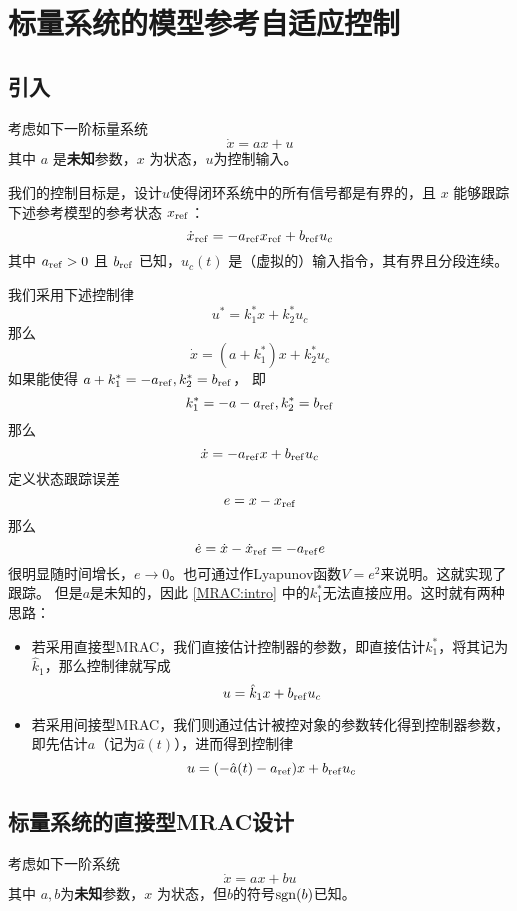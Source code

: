 \newpage
\section{标量系统的模型参考自适应控制}\label{4Bref}
\subsection{引入}
考虑如下一阶标量系统
\[ \dot{x} = a  x + u \]
其中 $a$ 是{\bf 未知}参数，$x$ 为状态，$u$为控制输入。

我们的控制目标是，设计$u$使得闭环系统中的所有信号都是有界的，且 $x$ 能够跟踪下述参考模型的参考状态  $x_{\operatorname{ref}}$：
\[ \dot{x}_{\operatorname{ref}} = - a_{\operatorname{ref}} x_{\operatorname{ref}} + b_{\operatorname{ref}} u_c \]
其中 $a_{\operatorname{ref}} > 0$ 且 $b_{\operatorname{ref}}$ 已知，$u_c (t)$ 是（虚拟的）输入指令，其有界且分段连续。

我们采用下述控制律
\[ u^{\ast} = k^{\ast}_1 x + k^{\ast}_2 u_c \]
那么
\[\dot{x} = (a +  k^{\ast}_1) x + k^{\ast}_2 {u_c} \]
如果能使得
$a+k^{\ast}_1=-a_{\operatorname{ref}},k^{\ast}_2=b_{\operatorname{ref}}$，
即
\begin{equation}\label{MRAC:intro}
  k^{\ast}_1 = - a - a_{\operatorname{ref}}, k^{\ast}_2 =  b_{\operatorname{ref}}
\end{equation}
那么
\[\dot{x} = -a_{\operatorname{ref}} x + b_{\operatorname{ref}} {u_c} \]
定义状态跟踪误差
\[ e = x - x_{\operatorname{ref}} \]
那么
\[ \dot{e} = \dot{x} - \dot{x}_{\operatorname{ref}} = - a_{\operatorname{ref}} e \]
很明显随时间增长，$e\to 0$。也可通过作Lyapunov函数$V=e^2$来说明。这就实现了跟踪。
但是$a$是未知的，因此 \eqref{MRAC:intro} 中的$k_1^\ast$无法直接应用。这时就有两种思路：
\begin{itemize}
  \item 若采用直接型MRAC，我们直接估计控制器的参数，即直接估计$k_1^\ast$，将其记为$\hat{k}_1$，那么控制律就写成
        \[u=\hat{k}_1 x + b_{\operatorname{ref}} u_c\]
  \item 若采用间接型MRAC，我们则通过估计被控对象的参数转化得到控制器参数，即先估计$a$（记为$ \hat{a} (t)$），进而得到控制律
        \[u=(- \hat{a} (t) - a_{\operatorname{ref}}) x + b_{\operatorname{ref}} u_c\]
\end{itemize}
\newpage
\subsection{标量系统的直接型MRAC设计}\label{sec:MRAC:scalar:direct}
考虑如下一阶系统
\begin{equation}
  \dot{x} = a  x + b  u \label{Sys:MRAC:scalar}
\end{equation}
其中 $a, b$为{\bf 未知}参数，$x$ 为状态，但$b$的符号$\operatorname{sgn}(b)$已知。

